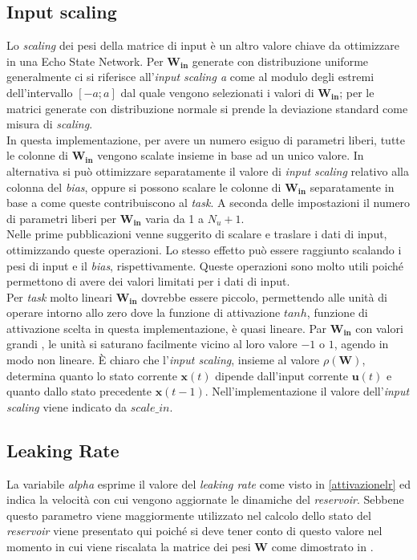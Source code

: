 \subsection{Input scaling}
Lo \textit{scaling} dei pesi della matrice di input è un altro valore chiave da ottimizzare in una Echo State Network. Per $\mathbf{W_{in}}$ generate con distribuzione uniforme generalmente ci si riferisce all'\textit{input scaling a} come al modulo degli estremi dell'intervallo $[-a;a]$ dal quale vengono selezionati i valori di $\mathbf{W_{in}}$; per le matrici generate con distribuzione normale si prende la deviazione standard come misura di \textit{scaling}.\\
In questa implementazione, per avere un numero esiguo di parametri liberi, tutte le colonne di $\mathbf{W_{in}}$ vengono scalate insieme in base ad un unico valore. In alternativa si può ottimizzare separatamente il valore di \textit{input \textit{scaling}} relativo alla colonna del \textit{bias}, oppure si possono scalare le colonne di $\mathbf{W_{in}}$ separatamente in base a come queste contribuiscono al \textit{task}. A seconda delle impostazioni il numero di parametri liberi per $\mathbf{W_{in}}$  varia da 1 a $N_u + 1$.\\
Nelle prime pubblicazioni venne suggerito di scalare e traslare i dati di input, ottimizzando queste operazioni. Lo stesso effetto può essere raggiunto scalando i pesi di input e il \textit{bias}, rispettivamente. Queste operazioni sono molto utili poiché permettono di avere dei valori limitati per i dati di input. \\
Per \textit{task} molto lineari $\mathbf{W_{in}}$ dovrebbe essere piccolo, permettendo alle unità di operare intorno allo zero dove la funzione di attivazione $tanh$, funzione di attivazione scelta in questa implementazione, è quasi lineare. Par  $\mathbf{W_{in}}$ con valori grandi , le unità si saturano facilmente vicino al loro valore $-1$ o $1$, agendo in modo non lineare. È chiaro che l'\textit{input scaling}, insieme al valore $\rho(\mathbf{W})$, determina quanto lo stato corrente $\mathbf{x}(t)$ dipende dall'input corrente $\mathbf{u}(t)$ e quanto dallo stato precedente  $\mathbf{x}(t-1)$. Nell'implementazione il valore dell'\textit{input scaling} viene indicato da $\mathit{scale\_in}$.

\subsection{Leaking Rate}
La variabile \textit{alpha} esprime il valore del \textit{leaking rate} come visto in \ref{attivazionelr} ed indica la velocità con cui vengono aggiornate le dinamiche del \textit{reservoir}. Sebbene questo parametro viene maggiormente utilizzato nel calcolo dello stato del \textit{reservoir} viene presentato qui  poiché si deve tener conto di questo valore nel momento in cui viene riscalata la matrice dei pesi $\mathbf{W}$ come dimostrato in \cite{leakingintegrator}. 




